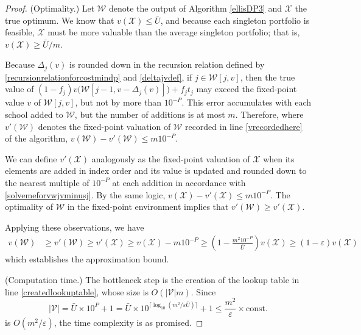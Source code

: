 \documentclass[12pt]{article} %
\theoremstyle{definition}
\theoremstyle{definition}
\begin{document}
\begin{proof}
(Optimality.) Let $\mathcal{W}$ denote the output of Algorithm \ref{ellisDP3} and $\mathcal{X}$ the true optimum. We know that $v(\mathcal{X}) \leq \bar U$, and because each singleton portfolio is feasible, $\mathcal{X}$ must be more valuable than the average singleton portfolio; that is, $v(\mathcal{X}) \geq \bar U / m$. 

Because $\Delta_j(v)$ is rounded down in the recursion relation defined by \eqref{recursionrelationforcostmindp} and \eqref{deltajvdef}, if $j \in \mathcal{W}[j, v]$, then the true value of $(1 - f_j) v\bigl(\mathcal{W}[j-1, v- \Delta_j(v)]\bigr) + f_j t_j$ may exceed the fixed-point value $v$ of $\mathcal{W}[j, v]$, but not by more than $10^{-P}$. This error accumulates with each school added to $\mathcal{W}$, but the number of additions is at most $m$. Therefore, where $v'(\mathcal{W})$ denotes the fixed-point valuation of $\mathcal{W}$ recorded in line \ref{vrecordedhere} of the algorithm, 
$v(\mathcal{W}) - v'(\mathcal{W}) \leq m 10^{-P}$.

We can define $v'(\mathcal{X})$ analogously as the fixed-point valuation of $\mathcal{X}$ when its elements are added in index order and its value is updated and rounded down to the nearest multiple of $10^{-P}$ at each addition in accordance with \eqref{solvemeforvwjvminusj}. By the same logic, 
$v(\mathcal{X}) - v'(\mathcal{X}) \leq m 10^{-P}$. The optimality of $\mathcal{W}$ in the fixed-point environment implies that $v'(\mathcal{W}) \geq v'(\mathcal{X})$. 

Applying these observations, we have
\begin{equation}
\begin{split}
v(\mathcal{W}) &\geq v'(\mathcal{W}) \geq v'(\mathcal{X})
\geq v(\mathcal{X}) - m 10^{-P}
\geq \left(1 - \frac{m^2 10^{-P}}{\bar U}\right) v(\mathcal{X})
\geq \left(1 - \varepsilon\right) v(\mathcal{X})
\end{split}
\end{equation}
which establishes the approximation bound. 

(Computation time.) The bottleneck step is the creation of the lookup table in line \ref{createdlookuptable}, whose size is $O(|\mathcal{V}| m)$. Since
\begin{equation}
|\mathcal{V}| = \bar U \times 10^{P} + 1 = \bar U \times 10^ { \bigl\lceil\log_{10}\left(m ^2/ \varepsilon \bar U\right)\bigr\rceil} + 1
\leq\frac{m^2}{\varepsilon} \times \text{const.}
\end{equation}
is $O(m^2/ \varepsilon)$, the time complexity is as promised. %
\end{proof}
\end{document}
